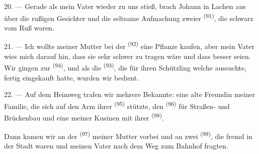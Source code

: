 20. --- Gerade als mein Vater wieder zu uns stieß, brach Johann in Lachen aus über
die rußigen Gesichter und die seltsame Aufmachung zweier 
\textsuperscript{(91)}, die schwarz vom Ruß waren.

21. --- Ich wollte meiner Mutter bei der 
\textsuperscript{(92)} eine Pflanze kaufen, aber mein Vater wies mich darauf hin, dass
sie sehr schwer zu tragen wäre und dass  besser seien. Wir gingen
zur  \textsuperscript{(94)}, und als die 
\textsuperscript{(93)}, die für ihren Schützling welche aussuchte, fertig eingekauft
hatte, wurden wir bedient.

22. --- Auf dem Heimweg trafen wir mehrere Bekannte: eine alte Freundin meiner
Familie, die sich auf den Arm ihrer  \textsuperscript{(95)}
stützte, den  \textsuperscript{(96)} für Straßen- und Brückenbau und
eine meiner Kusinen mit ihrer  \textsuperscript{(98)}.

Dann kamen wir an der  \textsuperscript{(97)} meiner Mutter
vorbei und an zwei  \textsuperscript{(99)}, die fremd in der Stadt
waren und meinen Vater nach dem Weg zum Bahnhof fragten.
\VUsaut{6.0mm}
\VUfilet{22mm}
